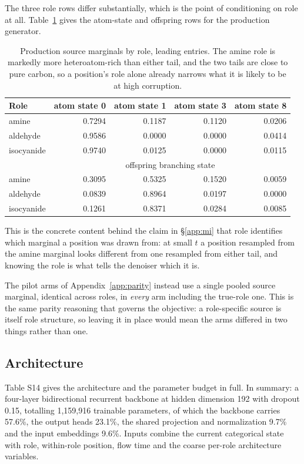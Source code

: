 \documentclass{article}
\begin{document}
The three role rows differ substantially, which is the point of conditioning on role at all.
Table~\ref{tab:source-marginals} gives the atom-state and offspring rows for the production
generator.

\begin{table}[h]
\centering
\caption{Production source marginals by role, leading entries. The amine role is markedly more
heteroatom-rich than either tail, and the two tails are close to pure carbon, so a position's role
alone already narrows what it is likely to be at high corruption.}
\label{tab:source-marginals}
\small
\begin{tabular}{@{}lrrrr@{}}
\toprule
Role & atom state 0 & atom state 1 & atom state 3 & atom state 8 \\
\midrule
amine       & 0.7294 & 0.1187 & 0.1120 & 0.0206 \\
aldehyde    & 0.9586 & 0.0000 & 0.0000 & 0.0414 \\
isocyanide  & 0.9740 & 0.0125 & 0.0000 & 0.0115 \\
\midrule
 & \multicolumn{4}{c}{offspring branching state} \\
\midrule
amine       & 0.3095 & 0.5325 & 0.1520 & 0.0059 \\
aldehyde    & 0.0839 & 0.8964 & 0.0197 & 0.0000 \\
isocyanide  & 0.1261 & 0.8371 & 0.0284 & 0.0085 \\
\bottomrule
\end{tabular}
\end{table}

This is the concrete content behind the claim in \S\ref{app:mi} that role identifies which marginal
a position was drawn from: at small $t$ a position resampled from the amine marginal looks different
from one resampled from either tail, and knowing the role is what tells the denoiser which it is.

The pilot arms of Appendix~\ref{app:parity} instead use a single pooled source marginal, identical
across roles, in \emph{every} arm including the true-role one. This is the same parity reasoning that
governs the objective: a role-specific source is itself role structure, so leaving it in place would
mean the arms differed in two things rather than one.

\subsection{Architecture}
\label{app:arch}
Table S14 gives the architecture and the parameter budget in full. In summary: a four-layer
bidirectional recurrent backbone at hidden dimension 192 with dropout 0.15, totalling 1,159,916
trainable parameters, of which the backbone carries 57.6\%, the output heads 23.1\%, the shared
projection and normalization 9.7\% and the input embeddings 9.6\%. Inputs combine the current
categorical state with role, within-role position, flow time and the coarse per-role architecture
variables.
\end{document}
